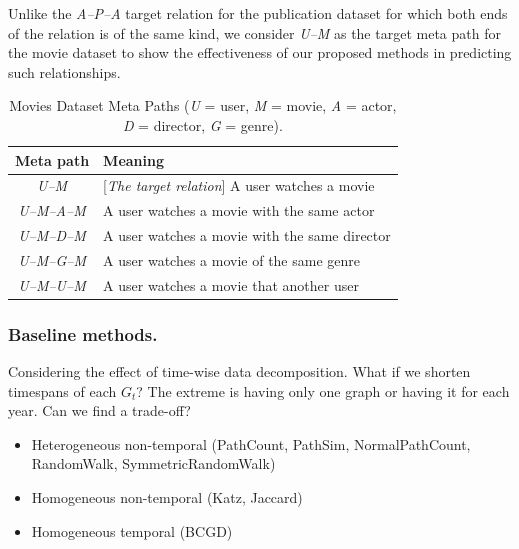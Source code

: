 Unlike the \textit{A--P--A} target relation for the publication dataset for which both ends of the relation is of the same kind, we consider \textit{U--M} as the target meta path for the movie dataset to show the effectiveness of our proposed methods in predicting such relationships.

\begin{table}[h]
\centering
\caption{Movies Dataset Meta Paths (\textit{U} = user, \textit{M} = movie, \textit{A} = actor, \textit{D} = director, \textit{G} = genre).}
\scriptsize
\label{table_movies}
\begin{tabular}{|c|l|} \hline
\textbf{Meta path} & \textbf{Meaning} \\ \hline
\textit{U--M} & [\textit{The target relation}] A user watches a movie \\ \hline

\textit{U--M--A--M} & A user watches a movie with the same actor \\ \hline
\textit{U--M--D--M} & A user watches a movie with the same director \\ \hline
\textit{U--M--G--M} & A user watches a movie of the same genre \\ \hline
\textit{U--M--U--M} & A user watches a movie that another user  \\ \hline

\end{tabular}
\end{table}


\subsubsection{Baseline methods.} Considering the effect of time-wise data decomposition. What if we shorten timespans of each $G_t$? The extreme is having only one graph or having it for each year. Can we find a trade-off?

\begin{itemize}
    \item  Heterogeneous non-temporal (PathCount, PathSim, NormalPathCount, RandomWalk, SymmetricRandomWalk)
    \item  Homogeneous non-temporal (Katz, Jaccard)
    \item  Homogeneous temporal (BCGD)
\end{itemize}

